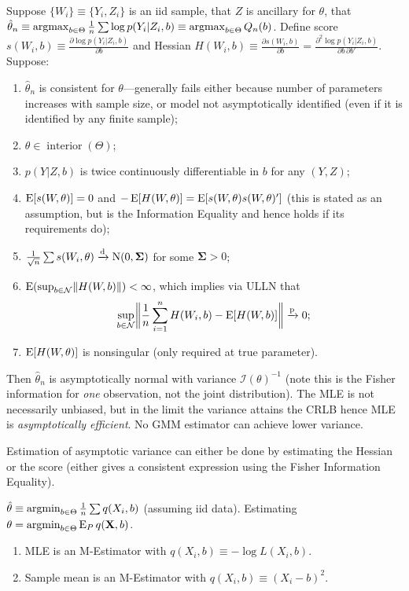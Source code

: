 \documentclass[8pt,letterpaper, landscape]{extarticle} %
\newcommand{\mX}{\ensuremath{\mathbf{X}}}
\newcommand{\mSigma}{\ensuremath{\mathbf{\Sigma}}}
\renewcommand{\ln}{\log}
\begin{document}
\begin{multicols}{3}
\begin{description}
 Suppose $ \{ W_i \} \equiv \{ Y_i, Z_i \} $ is an iid sample, that $ Z $ is ancillary for $ \theta $, that $ \hat{\theta}_n \equiv \operatorname*{argmax}_{b \in \Theta} \tfrac{1}{n} \sum \log p (Y_i | Z_i, b) \equiv \operatorname*{argmax}_{b \in \Theta} Q_n(b) $. Define score $ s(W_i, b) \equiv \frac{\partial \log p(Y_i | Z_i, b)}{\partial b} $ and Hessian $ H(W_i, b) \equiv \frac{\partial s (W_i, b)}{\partial b} = \frac{\partial^2 \log p (Y_i | Z_i, b)}{\partial b \, \partial b'} $. Suppose:
\begin{enumerate}
\item $ \hat{\theta}_n $ is consistent for $ \theta $---generally fails either because number of parameters increases with sample size, or model not asymptotically identified (even if it is identified by any finite sample);
\item $ \theta \in \operatorname{interior} (\Theta) $;
\item $ p(Y|Z, b) $ is twice continuously differentiable in $ b $ for any $ (Y, Z) $;
\item $ \operatorname{E} [s(W, \theta)] = 0 $ and $ -\operatorname{E} [H(W, \theta)] = \operatorname{E} [s(W, \theta) s(W, \theta)'] $ (this is stated as an assumption, but is the Information Equality and hence holds if its requirements do);
\item $ \frac{1}{\sqrt{n}} \sum s(W_i, \theta) \xrightarrow{\text{d}} \n (0, \mSigma) $ for some $ \mSigma > 0 $;
\item $ \operatorname{E} ( \sup_{b \in \mathcal{N}} \lVert H(W, b) \rVert ) < \infty $, which implies via ULLN that
$$ \sup_{b \in \mathcal{N}} \biggl \lVert \frac{1}{n} \sum_{i=1}^{n} H(W_i, b) - \operatorname{E} [H(W, b)] \biggr \rVert \xrightarrow{\text{p}} 0 ; $$
\item $ \operatorname{E} [H(W, \theta)] $ is nonsingular (only required at true parameter).
\end{enumerate}
Then $ \hat{\theta}_n $ is asymptotically normal with variance $ \mathcal{I}(\theta)^{-1} $ (note this is the Fisher information for \textit{one} observation, not the joint distribution). The MLE is not necessarily unbiased, but in the limit the variance attains the CRLB hence MLE is \textit{asymptotically efficient}. No GMM estimator can achieve lower variance.

Estimation of asymptotic variance can either be done by estimating the Hessian or the score (either gives a consistent expression using the Fisher Information Equality).

 $ \hat{\theta} \equiv \operatorname*{argmin}_{b \in \Theta} \tfrac{1}{n} \sum q(X_i, b) $ (assuming iid data). Estimating $ \theta = \argmin_{b \in \Theta} \E_{P} q(\mX, b) $.
\begin{enumerate}
\item MLE is an M-Estimator with $ q(X_i, b) \equiv - \ln L(X_i, b) $.
\item Sample mean is an M-Estimator with $ q(X_i, b) \equiv (X_i - b)^2 $.
\end{enumerate}


\end{description}
\end{multicols}
\end{document}
